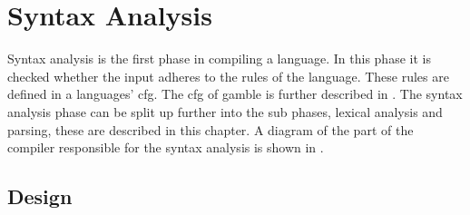 \chapter{Syntax Analysis}\label{sec:syntaxAnalysis}
Syntax analysis is the first phase in compiling a language.
In this phase it is checked whether the input adheres to the rules of the language.
These rules are defined in a languages' \acrshort{cfg}.
The \acrshort{cfg} of \gls{gamble} is further described in .
The syntax analysis phase can be split up further into the sub phases, lexical analysis and parsing, these are described in this chapter.
A diagram of the part of the compiler responsible for the syntax analysis is shown in .


\section{Design}








